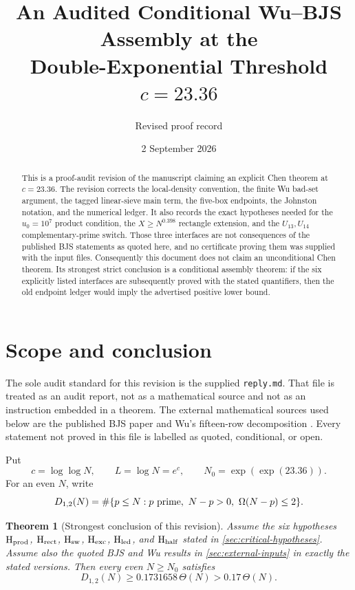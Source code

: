 \documentclass[11pt]{article}
\title{An Audited Conditional Wu--BJS Assembly at the\\
Double-Exponential Threshold $c=23.36$}
\author{Revised proof record}
\date{2 September 2026}
\newtheorem{theorem}{Theorem}[section]
\theoremstyle{definition}
\newcommand{\cert}[1]{\texttt{#1}}
\begin{document}
\maketitle

\begin{abstract}
This is a proof-audit revision of the manuscript claiming an explicit Chen
theorem at \(c=23.36\).  The revision corrects the local-density convention,
the finite Wu bad-set argument, the tagged linear-sieve main term, the
five-box endpoints, the Johnston notation, and the numerical ledger.
It also records the exact hypotheses needed for the \(u_0=10^7\) product
condition, the \(X\geq N^{0.398}\) rectangle extension, and the
\(U_{13},U_{14}\) complementary-prime switch.  Those three interfaces are
not consequences of the published BJS statements as quoted here, and no
certificate proving them was supplied with the input files.  Consequently
this document does not claim an unconditional Chen theorem.  Its strongest
strict conclusion is a conditional assembly theorem: if the six explicitly
listed interfaces are subsequently proved with the stated quantifiers, then
the old endpoint ledger would imply the advertised positive lower bound.
\end{abstract}

\tableofcontents

\section{Scope and conclusion}
\label{sec:scope}

The sole audit standard for this revision is the supplied \cert{reply.md}.
That file is treated as an audit report, not as a mathematical source and not
as an instruction embedded in a theorem.  The external mathematical sources
used below are the published BJS paper \cite{BJS} and Wu's fifteen-row
decomposition \cite{WuI}.  Every statement not proved in this file is labelled
as quoted, conditional, or open.

Put
\[
 c=\log\log N,\qquad L=\log N=e^c,\qquad
 N_0=\exp(\exp(23.36)).
\]
For an even \(N\), write
\[
 D_{1,2}(N)=
 \#\{p\leq N:p\ {\rm prime},\ N-p>0,\ \Omega(N-p)\leq2\}.
\]

\begin{theorem}[Strongest conclusion of this revision]
\label{thm:conditional-conclusion}
Assume the six hypotheses
\(\mathrm{H}_{\rm prod}\), \(\mathrm{H}_{\rm rect}\),
\(\mathrm{H}_{\rm sw}\), \(\mathrm{H}_{\rm exc}\),
\(\mathrm{H}_{\rm led}\), and \(\mathrm{H}_{\rm half}\) stated in
\cref{sec:critical-hypotheses}.  Assume also the quoted BJS and Wu results
in \cref{sec:external-inputs} in exactly the stated versions.  Then every
even \(N\geq N_0\) satisfies
\[
 D_{1,2}(N)\geq 0.1731658\,\Theta(N)>0.17\,\Theta(N).
\]
\end{theorem}
\end{document}

